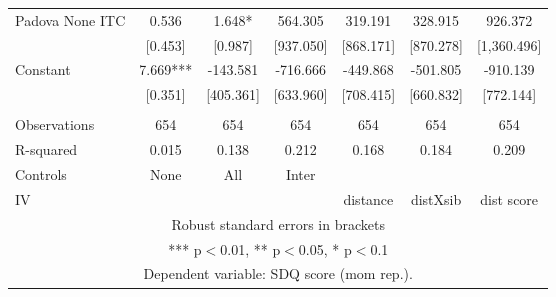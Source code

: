 \begin{tabular}{lcccccc}
Padova None ITC & 0.536 & 1.648* & 564.305 & 319.191 & 328.915 & 926.372 \\
 & [0.453] & [0.987] & [937.050] & [868.171] & [870.278] & [1,360.496] \\
Constant & 7.669*** & -143.581 & -716.666 & -449.868 & -501.805 & -910.139 \\
 & [0.351] & [405.361] & [633.960] & [708.415] & [660.832] & [772.144] \\
 &  &  &  &  &  &  \\
Observations & 654 & 654 & 654 & 654 & 654 & 654 \\
R-squared & 0.015 & 0.138 & 0.212 & 0.168 & 0.184 & 0.209 \\
Controls & None & All & Inter &  &  &  \\
 IV &  &  &  & distance & distXsib & dist score \\ \hline
\multicolumn{7}{c}{ Robust standard errors in brackets} \\
\multicolumn{7}{c}{ *** p$<$0.01, ** p$<$0.05, * p$<$0.1} \\
\multicolumn{7}{c}{ Dependent variable: SDQ score (mom rep.).} \\
\end{tabular}
